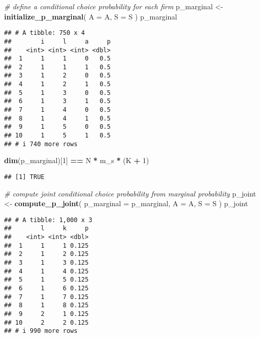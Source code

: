 \documentclass[
]{book}
\newenvironment{Shaded}{\begin{snugshade}}{\end{snugshade}}
\newcommand{\AttributeTok}[1]{\textcolor[rgb]{0.13,0.29,0.53}{#1}}
\newcommand{\CommentTok}[1]{\textcolor[rgb]{0.56,0.35,0.01}{\textit{#1}}}
\newcommand{\DecValTok}[1]{\textcolor[rgb]{0.00,0.00,0.81}{#1}}
\newcommand{\FunctionTok}[1]{\textcolor[rgb]{0.13,0.29,0.53}{\textbf{#1}}}
\newcommand{\NormalTok}[1]{#1}
\newcommand{\OtherTok}[1]{\textcolor[rgb]{0.56,0.35,0.01}{#1}}
\newcommand{\SpecialCharTok}[1]{\textcolor[rgb]{0.81,0.36,0.00}{\textbf{#1}}}
\begin{document}
\begin{Shaded}
\begin{Highlighting}[]
\CommentTok{\# define a conditional choice probability for each firm}
\NormalTok{p\_marginal }\OtherTok{\textless{}{-}} 
  \FunctionTok{initialize\_p\_marginal}\NormalTok{(}
    \AttributeTok{A =}\NormalTok{ A,}
    \AttributeTok{S =}\NormalTok{ S}
\NormalTok{    )}
\NormalTok{p\_marginal}
\end{Highlighting}
\end{Shaded}

\begin{verbatim}
## # A tibble: 750 x 4
##        i     l     a     p
##    <int> <int> <int> <dbl>
##  1     1     1     0   0.5
##  2     1     1     1   0.5
##  3     1     2     0   0.5
##  4     1     2     1   0.5
##  5     1     3     0   0.5
##  6     1     3     1   0.5
##  7     1     4     0   0.5
##  8     1     4     1   0.5
##  9     1     5     0   0.5
## 10     1     5     1   0.5
## # i 740 more rows
\end{verbatim}

\begin{Shaded}
\begin{Highlighting}[]
\FunctionTok{dim}\NormalTok{(p\_marginal)[}\DecValTok{1}\NormalTok{] }\SpecialCharTok{==}\NormalTok{ N }\SpecialCharTok{*}\NormalTok{ m\_s }\SpecialCharTok{*}\NormalTok{ (K }\SpecialCharTok{+} \DecValTok{1}\NormalTok{)}
\end{Highlighting}
\end{Shaded}

\begin{verbatim}
## [1] TRUE
\end{verbatim}

\begin{Shaded}
\begin{Highlighting}[]
\CommentTok{\# compute joint conditional choice probability from marginal probability}
\NormalTok{p\_joint }\OtherTok{\textless{}{-}} 
  \FunctionTok{compute\_p\_joint}\NormalTok{(}
    \AttributeTok{p\_marginal =}\NormalTok{ p\_marginal, }
    \AttributeTok{A =}\NormalTok{ A, }
    \AttributeTok{S =}\NormalTok{ S}
\NormalTok{    )}
\NormalTok{p\_joint}
\end{Highlighting}
\end{Shaded}

\begin{verbatim}
## # A tibble: 1,000 x 3
##        l     k     p
##    <int> <int> <dbl>
##  1     1     1 0.125
##  2     1     2 0.125
##  3     1     3 0.125
##  4     1     4 0.125
##  5     1     5 0.125
##  6     1     6 0.125
##  7     1     7 0.125
##  8     1     8 0.125
##  9     2     1 0.125
## 10     2     2 0.125
## # i 990 more rows
\end{verbatim}
\end{document}
